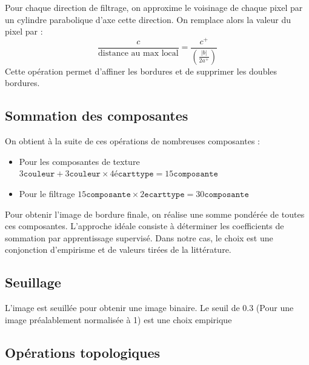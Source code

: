 \documentclass{article}
\begin{document}
\begin{multicols}{2}
Pour chaque direction de filtrage, on approxime le voisinage de chaque pixel par un cylindre parabolique d'axe cette direction. On remplace alors la valeur du pixel par :
$$\frac{c}{\text{distance au max local}} = \frac{c^+}{\left(\frac{|b|}{2a^+}\right)}$$
Cette opération permet d'affiner les bordures et de supprimer les doubles bordures.

\subsection{Sommation des composantes}

On obtient à la suite de ces opérations de nombreuses composantes :
\begin{itemize}
	\item Pour les composantes de texture $3\mathtt{couleur} + 3\mathtt{couleur} \times 4\mathtt{écarttype} = 15\mathtt{composante}$
	\item Pour le filtrage $15\mathtt{composante} \times 2\mathtt{ecarttype} = 30\mathtt{composante}$
\end{itemize}
Pour obtenir l'image de bordure finale, on réalise une somme pondérée de toutes ces composantes. L'approche idéale consiste à déterminer les coefficients de sommation  par apprentissage supervisé. Dans notre cas, le choix est une conjonction d'empirisme et de valeurs tirées de la littérature.

\subsection{Seuillage}

L'image est seuillée pour obtenir une image binaire. Le seuil de 0.3 (Pour une image préalablement normalisée à 1) est une choix empirique

\subsection{Opérations topologiques}


\end{multicols}
\end{document}
